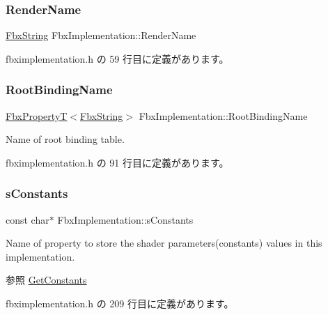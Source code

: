\subsubsection{\texorpdfstring{Render\+Name}{RenderName}}
{\footnotesize\ttfamily \hyperlink{class_fbx_string}{Fbx\+String} Fbx\+Implementation\+::\+Render\+Name}



 fbximplementation.\+h の 59 行目に定義があります。

\mbox{\label{class_fbx_implementation_a80df4effca2446b00f8925634c3d26aa}} 
\subsubsection{\texorpdfstring{Root\+Binding\+Name}{RootBindingName}}
{\footnotesize\ttfamily \hyperlink{class_fbx_property_t}{Fbx\+PropertyT}$<$\hyperlink{class_fbx_string}{Fbx\+String}$>$ Fbx\+Implementation\+::\+Root\+Binding\+Name}



Name of root binding table. 



 fbximplementation.\+h の 91 行目に定義があります。

\mbox{\label{class_fbx_implementation_a16188a40d70a73622c093ba3143fedac}} 
\subsubsection{\texorpdfstring{s\+Constants}{sConstants}}
{\footnotesize\ttfamily const char$\ast$ Fbx\+Implementation\+::s\+Constants\hspace{0.3cm}{\ttfamily [static]}}

Name of property to store the shader parameters(constants) values in this implementation. \begin{DoxySeeAlso}{参照}
\hyperlink{class_fbx_implementation_a6b8a6fd6e27dbd2707dc8264b24ab5c9}{Get\+Constants} 
\end{DoxySeeAlso}


 fbximplementation.\+h の 209 行目に定義があります。


